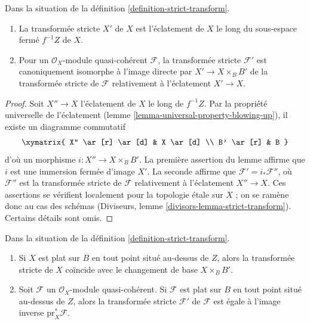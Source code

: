 \begin{lemma}
\label{lemma-strict-transform}
Dans la situation de la définition \ref{definition-strict-transform}.
\begin{enumerate}
\item La transformée stricte $X'$ de $X$ est l'éclatement de $X$ le long du
sous-espace fermé $f^{-1}Z$ de $X$.
\item Pour un $\mathcal{O}_X$-module quasi-cohérent $\mathcal{F}$, la
transformée stricte $\mathcal{F}'$ est canoniquement isomorphe à
l'image directe par $X' \to X \times_B B'$ de la transformée stricte de
$\mathcal{F}$ relativement à l'éclatement $X' \to X$.
\end{enumerate}
\end{lemma}

\begin{proof}
Soit $X'' \to X$ l'éclatement de $X$ le long de $f^{-1}Z$. Par la propriété
universelle de l'éclatement (lemme \ref{lemma-universal-property-blowing-up}),
il existe un diagramme commutatif
$$
\xymatrix{
X'' \ar[r] \ar[d] & X \ar[d] \\
B' \ar[r] & B
}
$$
d'où un morphisme $i : X'' \to X \times_B B'$. La première assertion
du lemme affirme que $i$ est une immersion fermée d'image $X'$.
La seconde affirme que $\mathcal{F}' = i_*\mathcal{F}''$,
où $\mathcal{F}''$ est la transformée stricte de $\mathcal{F}$
relativement à l'éclatement $X'' \to X$. Ces assertions se vérifient
localement pour la topologie étale sur $X$ ; on se ramène donc au cas des schémas
(Diviseurs, lemme \ref{divisors-lemma-strict-transform}).
Certains détails sont omis.
\end{proof}

\begin{lemma}
\label{lemma-strict-transform-flat}
Dans la situation de la définition \ref{definition-strict-transform}.
\begin{enumerate}
\item Si $X$ est plat sur $B$ en tout point situé au-dessus de $Z$, alors
la transformée stricte de $X$ coïncide avec le changement de base $X \times_B B'$.
\item Soit $\mathcal{F}$ un $\mathcal{O}_X$-module quasi-cohérent.
Si $\mathcal{F}$ est plat sur $B$ en tout point situé au-dessus de $Z$, alors
la transformée stricte $\mathcal{F}'$ de $\mathcal{F}$ est égale à
l'image inverse $\text{pr}_X^*\mathcal{F}$.
\end{enumerate}
\end{lemma}

